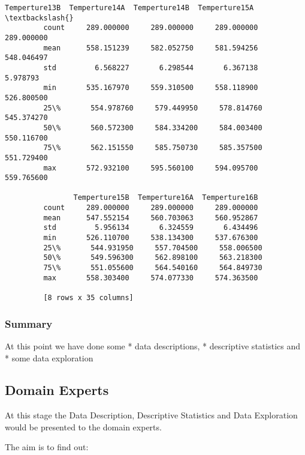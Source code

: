 \documentclass[11pt]{article}
\begin{document}
\begin{Verbatim}[commandchars=\\\{\}]
                Temperture13B  Temperture14A  Temperture14B  Temperture15A  \textbackslash{}
         count     289.000000     289.000000     289.000000     289.000000   
         mean      558.151239     582.052750     581.594256     548.046497   
         std         6.568227       6.298544       6.367138       5.978793   
         min       535.167970     559.310500     558.118900     526.800500   
         25\%       554.978760     579.449950     578.814760     545.374270   
         50\%       560.572300     584.334200     584.003400     550.116700   
         75\%       562.151550     585.750730     585.357500     551.729400   
         max       572.932100     595.560100     594.095700     559.765600   
         
                Temperture15B  Temperture16A  Temperture16B  
         count     289.000000     289.000000     289.000000  
         mean      547.552154     560.703063     560.952867  
         std         5.956134       6.324559       6.434496  
         min       526.110700     538.134300     537.676300  
         25\%       544.931950     557.704500     558.006500  
         50\%       549.596300     562.898100     563.218300  
         75\%       551.055600     564.540160     564.849730  
         max       558.303400     574.077330     574.363500  
         
         [8 rows x 35 columns]
\end{Verbatim}
            
    \subsubsection{Summary}\label{summary}

At this point we have done some * data descriptions, * descriptive
statistics and * some data exploration

    \subsection{Domain Experts}\label{domain-experts}

At this stage the Data Description, Descriptive Statistics and Data
Exploration would be presented to the domain experts.

The aim is to find out:
\end{document}
